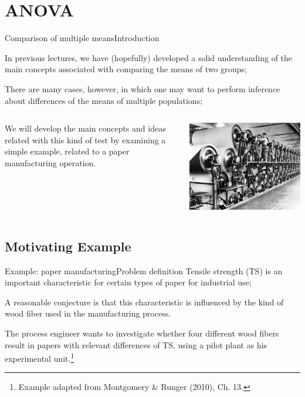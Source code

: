 


\section{ANOVA}


\begin{frame}{Comparison of multiple means}{Introduction}

In previous lectures, we have (hopefully) developed a solid understanding of the main concepts associated with comparing the means of two groups;\bigskip

There are many cases, however, in which one may want to perform inference about differences of the means of multiple populations;\bigskip

\begin{columns}
  We will develop the main concepts and ideas related with this kind of test by examining a simple example, related to a paper manufacturing operation.

  \includegraphics[width=\textwidth]{../img/papermill.jpg}
\end{columns}
\end{frame}

\subsection{Motivating Example}
  \begin{frame}{Example: paper manufacturing}{Problem definition}
  Tensile strength (TS) is an important characteristic for certain types of paper for industrial use;
  \bigskip

  A reasonable conjecture is that this characteristic is influenced by the kind of wood fiber used in the manufacturing process.
  \bigskip

  The process engineer wants to investigate whether four different wood fibers result in papers with relevant differences of TS, using a pilot plant as his experimental unit.\footnote{Example adapted from Montgomery \& Runger (2010), Ch. 13.}
\end{frame}

